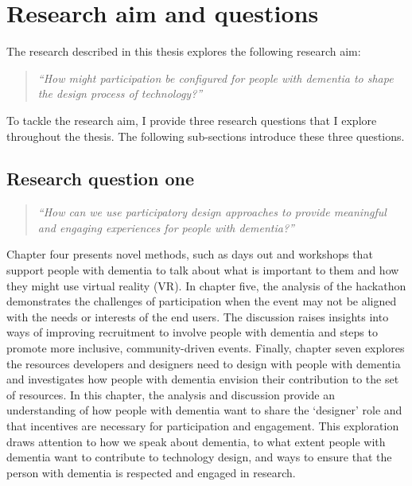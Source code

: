 \section{Research aim and questions}
\label{Intro:RQ}
The research described in this thesis explores the following research aim:
\begin{quote}
    \textit{``How might participation be configured for people with dementia to shape the design process of technology?''}
\end{quote}
To tackle the research aim, I provide three research questions that I explore throughout the thesis. The following sub-sections introduce these three questions.

\subsection{Research question one}
\label{RQ1}
\begin{quote}
\textit{``How can we use participatory design approaches to provide meaningful and engaging experiences for people with dementia?''}
\end{quote}
Chapter four presents novel methods, such as days out and workshops that support people with dementia to talk about what is important to them and how they might use virtual reality (VR). In chapter five, the analysis of the hackathon demonstrates the challenges of participation when the event may not be aligned with the needs or interests of the end users. The discussion raises insights into ways of improving recruitment to involve people with dementia and steps to promote more inclusive, community-driven events. Finally, chapter seven explores the resources developers and designers need to design with people with dementia and investigates how people with dementia envision their contribution to the set of resources. In this chapter, the analysis and discussion provide an understanding of how people with dementia want to share the `designer' role and that incentives are necessary for participation and engagement. This exploration draws attention to how we speak about dementia, to what extent people with dementia want to contribute to technology design, and ways to ensure that the person with dementia is respected and engaged in research.

